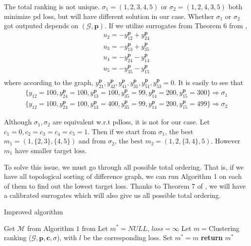 The total ranking is not unique. $\sigma_1=(1,2,3,4,5)$ or $\sigma_2=(1,2,4,3,5)$ both minimize pd loss, but will have different solution in our case. Whether $\sigma_1$ or $\sigma_2$ got outputed depends on $(\mathcal{G}, \mathbf{p})$. If we utilize surrogates from Theorem 6 from \cite{ramaswamy2013convex}, 
\begin{equation*}
\begin{split}
u_2=-y_{12}^{\mathbf{p}}+y_{24}^{\mathbf{p}}\\
u_3 = -y_{13}^{\mathbf{p}}+y_{35}^{\mathbf{p}}\\
u_4 = -y_{24}^{\mathbf{p}}-y_{14}^{\mathbf{p}}\\
u_5 = -y_{35}^{\mathbf{p}}-y_{15}^{\mathbf{p}}\\
\end{split}
\end{equation*}
where according to the graph, $y_{21}^{\mathbf{p}}, y_{42}^{\mathbf{p}}, y_{41}^{\mathbf{p}}, y_{31}^{\mathbf{p}}, y_{51}^{\mathbf{p}}, y_{53}^{\mathbf{p}}=0$. It is easily to see that
\begin{equation*}
\begin{split}
\{y_{12}=100, y_{24}^{\mathbf{p}}=100, y_{13}^{\mathbf{p}}=100, y_{35}^{\mathbf{p}}=99, y_{14}^{\mathbf{p}}=200, y_{15}^{\mathbf{p}}=300\}\Rightarrow \sigma_1\\
\{y_{12}=100, y_{24}^{\mathbf{p}}=100, y_{13}^{\mathbf{p}}=400, y_{35}^{\mathbf{p}}=99, y_{14}^{\mathbf{p}}=200, y_{15}^{\mathbf{p}}=499\}\Rightarrow \sigma_2
\end{split}
\end{equation*}

Although $\sigma_1, \sigma_2$ are equivalent w.r.t pdloss, it is not for our case. Let $c_1=0, c_2=c_3=c_4=c_5=1$. Then if we start from $\sigma_1$, the best $m_1=(1,\{2,3\}, \{4,5\})$ and from $\sigma_2$, the best $m_2=(1,2,\{3,4\}, 5)$. However $m_1$ have smaller target loss. 

To solve this issue, we must go through all possible total ordering. That is, if we have all topological sorting of difference graph, we can run Algorithm 1 on each of them to find out the lowest target loss. Thanks to Theorem 7 of \cite{ramaswamy2013convex}, we will have a calibrated surrogates which will also give us all possible total ordering.

\begin{algorithm}[H]
	\caption{Improved algorithm}
	\begin{algorithmic}[1]
		\State Get $\mathcal{M}$ from Algorithm $1$ from \cite{ramaswamy2013convex}
		\State Let $m^*=NULL$, $loss = \infty$
		\State
		Let $m=${Clustering ranking }{($\mathcal{G}, \mathbf{p}, \mathbf{c}, \sigma$)}, with $l$ be the corresponding loss.
		Set $m^*=m$
		\EndIf
		\EndFor
		\State \textbf{return} $m^*$
		\EndProcedure
	\end{algorithmic}
\end{algorithm}

